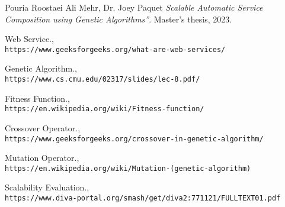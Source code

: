 \documentclass[12pt,letterpaper]{report}
\begin{document}

\begin{thebibliography}{7}

    
    Pouria Roostaei Ali Mehr, Dr. Joey Paquet 
    \textit{Scalable Automatic Service Composition using Genetic Algorithms”}. 
    Master's thesis, 2023.    
    
    Web Service.,
    \\\texttt{https://www.geeksforgeeks.org/what-are-web-services/}
    
    Genetic Algorithm.,
    \\\texttt{https://www.cs.cmu.edu/02317/slides/lec-8.pdf/}
    
     Fitness Function.,  
     \\\texttt{https://en.wikipedia.org/wiki/Fitness-function/}
     
    Crossover Operator.,
    \\\texttt{https://www.geeksforgeeks.org/crossover-in-genetic-algorithm/}
    
    Mutation Operator.,
    \\\texttt{https://en.wikipedia.org/wiki/Mutation-(genetic-algorithm)}
    
    Scalability Evaluation.,
    \\\texttt{https://www.diva-portal.org/smash/get/diva2:771121/FULLTEXT01.pdf}
    
    

    
\end{thebibliography}
\end{document}
